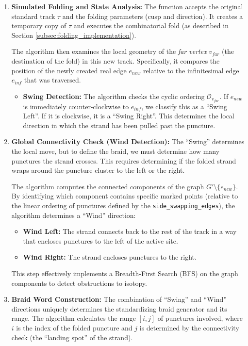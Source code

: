 \begin{enumerate}
    \item \textbf{Simulated Folding and State Analysis:}
    The function accepts the original standard track $\tau$ and the folding parameters (cusp and direction). It creates a temporary copy of $\tau$ and executes the combinatorial fold (as described in Section \ref{subsec:folding_implementation}).

    The algorithm then examines the local geometry of the \textit{far vertex} $v_{far}$ (the destination of the fold) in this new track. Specifically, it compares the position of the newly created real edge $e_{new}$ relative to the infinitesimal edge $e_{inf}$ that was traversed.
    \begin{itemize}
        \item \textbf{Swing Detection:} The algorithm checks the cyclic ordering $\mathcal{O}_{v_{far}}$. If $e_{new}$ is immediately counter-clockwise to $e_{inf}$, we classify this as a ``Swing Left''. If it is clockwise, it is a ``Swing Right''. This determines the local direction in which the strand has been pulled past the puncture.
    \end{itemize}

    \item \textbf{Global Connectivity Check (Wind Detection):}
    The ``Swing'' determines the local move, but to define the braid, we must determine how many punctures the strand crosses. This requires determining if the folded strand wraps around the puncture cluster to the left or the right.

    The algorithm computes the connected components of the graph $G' \setminus \{e_{new}\}$. By identifying which component contains specific marked points (relative to the linear ordering of punctures defined by the \texttt{side\_swapping\_edges}), the algorithm determines a ``Wind'' direction:
    \begin{itemize}
        \item \textbf{Wind Left:} The strand connects back to the rest of the track in a way that encloses punctures to the left of the active site.
        \item \textbf{Wind Right:} The strand encloses punctures to the right.
    \end{itemize}
    This step effectively implements a Breadth-First Search (BFS) on the graph components to detect obstructions to isotopy.

    \item \textbf{Braid Word Construction:}
    The combination of ``Swing'' and ``Wind'' directions uniquely determines the standardizing braid generator and its range. The algorithm calculates the range $[i, j]$ of punctures involved, where $i$ is the index of the folded puncture and $j$ is determined by the connectivity check (the ``landing spot'' of the strand).


\end{enumerate}
